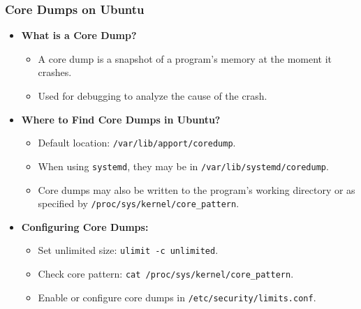\begin{frame}
\frametitle{Core Dumps on Ubuntu}

\begin{itemize}
    \item \textbf{What is a Core Dump?}
    \begin{itemize}
        \item A core dump is a snapshot of a program's memory at the moment it crashes.
        \item Used for debugging to analyze the cause of the crash.
    \end{itemize}

    \item \textbf{Where to Find Core Dumps in Ubuntu?}
    \begin{itemize}
        \item Default location: \texttt{/var/lib/apport/coredump}.
        \item When using \texttt{systemd}, they may be in \texttt{/var/lib/systemd/coredump}.
        \item Core dumps may also be written to the program's working directory or as specified by \texttt{/proc/sys/kernel/core\_pattern}.
    \end{itemize}

    \item \textbf{Configuring Core Dumps:}
    \begin{itemize}
        \item Set unlimited size: \texttt{ulimit -c unlimited}.
        \item Check core pattern: \texttt{cat /proc/sys/kernel/core\_pattern}.
        \item Enable or configure core dumps in \texttt{/etc/security/limits.conf}.
    \end{itemize}
\end{itemize}

\end{frame}

